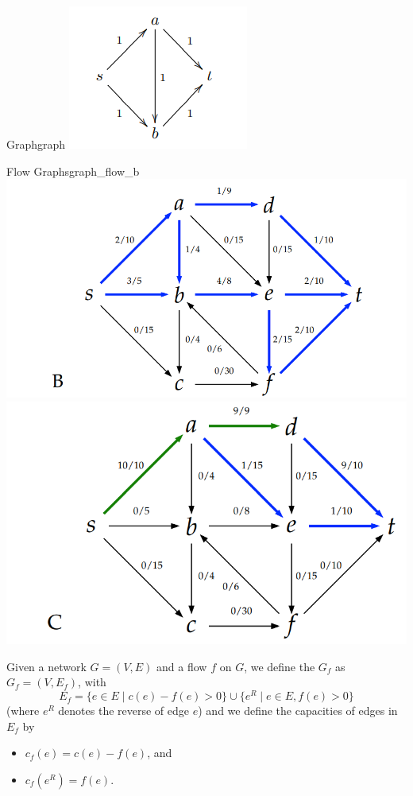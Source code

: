 \documentclass{tufte-handout}
\begin{document}
\begin{questions}
\begin{model}{Graph}{graph}
\includegraphics{Flow_POGIL_1.png}
\label{graph1}
\end{model}

\begin{model}{Flow Graphs}{graph_flow_b}
\includegraphics[scale=.68]{Flow_POGIL_2.png}
\includegraphics[scale=.68]{Flow_POGIL_3.png}
\label{graph_flow_b}
\end{model}

\begin{defn}
  Given a network $G=(V,E)$ and a flow $f$ on $G$, we define the
   $G_{f}$ as $G_{f}=(V,E_f)$, with
  \[ E_f = \{ e \in E \mid c(e) - f(e) > 0 \} \cup \{ e^R \mid e \in
    E, f(e) > 0 \} \] (where $e^R$ denotes the reverse of edge $e$)
  and we define the capacities of edges in $E_f$ by
  \begin{itemize}
  \item $c_{f}(e)=c(e)-f(e)$, and
  \item $c_{f}(e^{R}) = f(e)$.
  \end{itemize}
\end{defn}


\end{questions}
\end{document}
